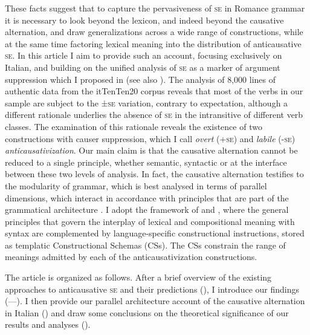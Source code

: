 \documentclass[output=paper,colorlinks,citecolor=brown
]{langscibook}
\begin{document}
These facts suggest that to capture the pervasiveness of \textsc{se} in Romance grammar it is necessary to look beyond the lexicon, and indeed beyond the causative alternation, and draw generalizations across a wide range of constructions, while at the same time factoring lexical meaning into the distribution of anticausative \textsc{se}. In this article I aim to provide such an account, focusing exclusively on Italian, and building on the unified analysis of \textsc{se} as a marker of argument suppression which I proposed in \citet{bentley2006split} (see also \cite{vanvalin1990semantic,centineo1995distribution}). The analysis of 8,000 lines of authentic data from the itTenTen20 corpus \citep{jakubicek2013tenten} reveals that most of the verbs in our sample are subject to the ±\textsc{se} variation, contrary to expectation, although a different rationale underlies the absence of \textsc{se} in the intransitive of different verb classes.  The examination of this rationale reveals the existence of two constructions with causer suppression, which I call \textit{overt} (+\textsc{se}) and \textit{labile} (-\textsc{se}) \textit{anticausativization}. Our main claim is that the causative alternation cannot be reduced to a single principle, whether semantic, syntactic or at the interface between these two levels of analysis. In fact, the causative alternation testifies to the modularity of grammar, which is best analysed in terms of parallel dimensions, which interact in accordance with principles that are part of the grammatical architecture \citep{bresnan1989locative,vanvalin1997syntax,jackendoff2002foundations,vanvalin2005exploring,vanvalin2023principles}. I adopt the framework of \citet{vanvalin1997syntax} and \citet{vanvalin2005exploring,vanvalin2023principles}, where the general principles that govern the interplay of lexical and compositional meaning with syntax are complemented by language-specific constructional instructions, stored as templatic Constructional Schemas (CSs). The CSs constrain the range of meanings admitted by each of the anticausativization constructions. 

The article is organized as follows. After a brief overview of the existing approaches to anticausative \textsc{se} and their predictions (), I introduce our findings (—). I then provide our parallel architecture account of the causative alternation in Italian () and draw some conclusions on the theoretical significance of our results and analyses (). 
\end{document}
